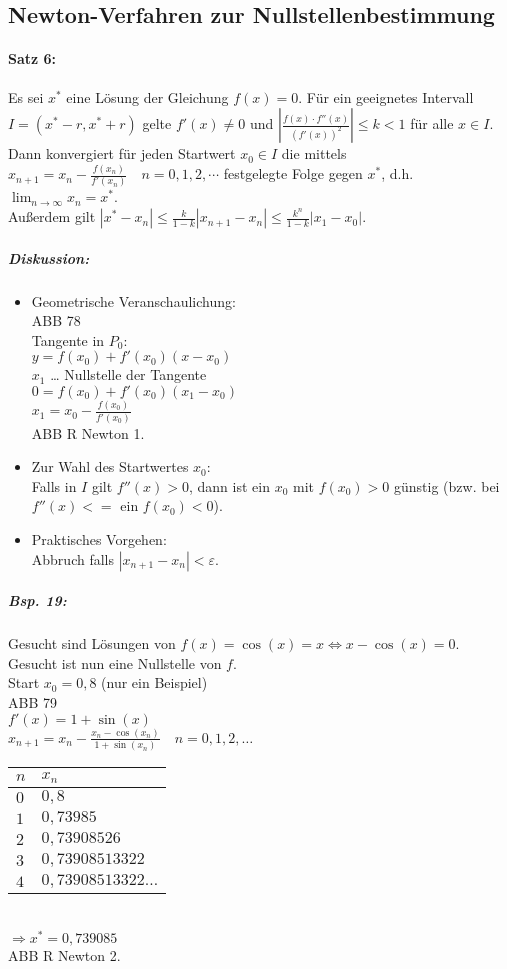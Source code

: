 \subsection{Newton-Verfahren zur Nullstellenbestimmung}
\paragraph{Satz 6:} Es sei $x^*$ eine Lösung der Gleichung $f(x)=0$. Für ein geeignetes Intervall $I=(x^*-r, x^*+r)$ gelte $f'(x)\not = 0$ und $\left|\frac{f(x)\cdot f''(x)}{(f'(x))^2}\right|\leq k < 1$ für alle $x \in I$.\\
Dann konvergiert für jeden Startwert $x_0\in I$ die mittels $x_{n+1}=x_n-\frac{f(x_n)}{f'(x_n)} \quad n=0,1,2,\cdots$ festgelegte Folge gegen $x^*$, d.h. $\lim_{n\to\infty}x_n=x^*$.\\
Außerdem gilt $|x^*-x_n|\leq \frac{k}{1-k}|x_{n+1}-x_n|\leq \frac{k^n}{1-k}|x_1-x_0|$.
\subparagraph{Diskussion:} 
\begin{itemize}
\item Geometrische Veranschaulichung:\\
ABB 78\\
Tangente in $P_0:$\\
$y=f(x_0)+f'(x_0)(x-x_0)$\\
$x_1$ … Nullstelle der Tangente\\
$0=f(x_0)+f'(x_0)(x_1-x_0)$\\
$x_1 = x_0-\frac{f(x_0)}{f'(x_0)}$\\
ABB R Newton 1.
\item Zur Wahl des Startwertes $x_0$:\\
Falls in $I$ gilt $f''(x)>0$, dann ist ein $x_0$ mit $f(x_0)>0$ günstig (bzw. bei $f''(x)<=$ ein $f(x_0)<0$).
\item Praktisches Vorgehen:\\
Abbruch falls $|x_{n+1}-x_n|<\varepsilon$.
\end{itemize}
\subparagraph{Bsp. 19:} Gesucht sind Lösungen von $f(x)=\cos (x)=x \Leftrightarrow x-\cos(x)=0$. Gesucht ist nun eine Nullstelle von $f$.\\
Start $x_0=0,8$ (nur ein Beispiel)\\
ABB 79\\
$f'(x)=1+\sin(x)$\\
$x_{n+1}=x_n-\frac{x_n-\cos(x_n)}{1+\sin(x_n)} \quad n=0,1,2, \dots$\\
\begin{tabular}{l | l}
$n$ & $x_n$\\
\hline 
$0$ & $0,8$\\
$1$ & $0,73985$\\
$2$ & $0,73908526$\\
$3$ & $0,73908513322$\\
$4$ & $0,73908513322\dots$\\
\end{tabular}\\
$\Rightarrow x^*=0,739085$\\
ABB R Newton 2. 

